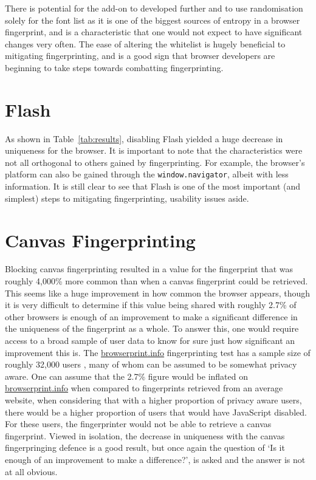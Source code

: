 There is potential for the add-on to developed further and to use randomisation solely for the font list as it is one of the biggest sources of entropy in a browser fingerprint, and is a characteristic that one would not expect to have significant changes very often.
The ease of altering the whitelist is hugely beneficial to mitigating fingerprinting, and is a good sign that browser developers are beginning to take steps towards combatting fingerprinting.

\section{Flash}

As shown in Table~\ref{tab:results}, disabling Flash yielded a huge decrease in uniqueness for the browser.
It is important to note that the characteristics were not all orthogonal to others gained by fingerprinting.
For example, the browser's platform can also be gained through the \texttt{window.navigator}, albeit with less information.
It is still clear to see that Flash is one of the most important (and simplest) steps to mitigating fingerprinting, usability issues aside.

\section{Canvas Fingerprinting}

Blocking canvas fingerprinting resulted in a value for the fingerprint that was roughly 4,000\% more common than when a canvas fingerprint could be retrieved.
This seems like a huge improvement in how common the browser appears, though it is very difficult to determine if this value being shared with roughly 2.7\% of other browsers is enough of an improvement to make a significant difference in the uniqueness of the fingerprint as a whole.
To answer this, one would require access to a broad sample of user data to know for sure just how significant an improvement this is.
The \url{browserprint.info} fingerprinting test has a sample size of roughly 32,000 users \citep{browserprint}, many of whom can be assumed to be somewhat privacy aware.
One can assume that the 2.7\% figure would be inflated on \url{browserprint.info} when compared to fingerprints retrieved from an average website, when considering that with a higher proportion of privacy aware users, there would be a higher proportion of users that would have JavaScript disabled.
For these users, the fingerprinter would not be able to retrieve a canvas fingerprint.
Viewed in isolation, the decrease in uniqueness with the canvas fingerpringing defence is a good result, but once again the question of `Is it enough of an improvement to make a difference?', is asked and the answer is not at all obvious.

